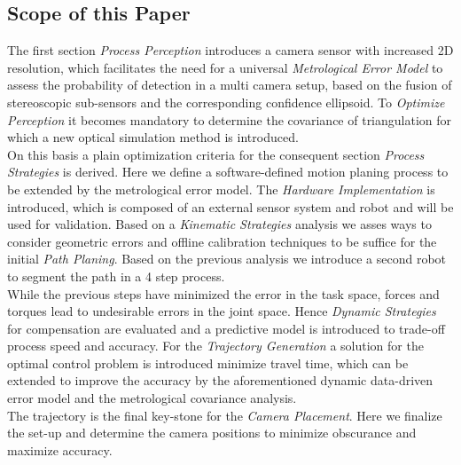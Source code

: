\documentclass[5p,times,procedia]{elsarticle}
\begin{document}
\subsection{Scope of this Paper}
The first section \textit{Process Perception} introduces a camera sensor with increased 2D resolution, which facilitates the need for a universal \textit{Metrological Error Model} to assess the probability of detection in a multi camera setup, based on the fusion of stereoscopic sub-sensors and the corresponding confidence ellipsoid. To \textit{Optimize Perception} it becomes mandatory to determine the covariance of triangulation for which a new optical simulation method is introduced.\\
On this basis a plain optimization criteria for the consequent section \textit{Process Strategies} is derived. Here we define a software-defined motion planing process to be extended by the metrological error model. The \textit{Hardware Implementation}  is introduced, which is composed of an external sensor system and robot and will be used for validation. Based on a \textit{Kinematic Strategies} analysis we asses ways to consider geometric errors and offline calibration techniques to be suffice for the initial \textit{Path Planing}. Based on the previous analysis we introduce a second robot to segment the path in a 4 step process.\\
While the previous steps have minimized the error in the task space, forces and torques lead to undesirable errors in the joint space.
Hence \textit{Dynamic Strategies} for compensation are evaluated and a predictive model is introduced to trade-off process speed and accuracy. For the \textit{Trajectory Generation} a solution for the optimal control problem is introduced minimize travel time, which can be extended to improve the accuracy by the aforementioned dynamic data-driven error model and the metrological covariance analysis.\\
The trajectory is the final key-stone for the \textit{Camera Placement}. Here we finalize the set-up and determine the camera positions
to minimize obscurance and maximize accuracy.
%
\end{document}
